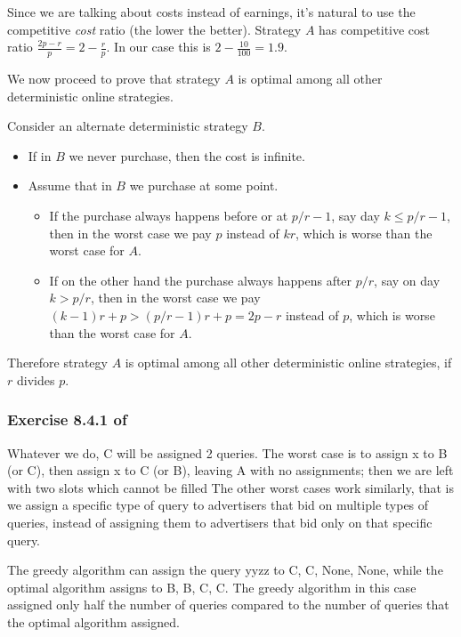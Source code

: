 \documentclass{article}
\begin{document}
Since we are talking about costs instead of earnings,
it's natural to use the competitive \emph{cost} ratio (the lower the better).
Strategy \(A\) has competitive cost ratio \(\frac{2p-r}{p} = 2 - \frac{r}{p}\).
In our case this is \(2 - \frac{10}{100} = 1.9\).

We now proceed to prove that strategy \(A\) is optimal
among all other deterministic online strategies.

Consider an alternate deterministic strategy \(B\).
\begin{itemize}
    \item If in \(B\) we never purchase,
        then the cost is infinite.
    \item Assume that in \(B\) we purchase at some point.
        \begin{itemize}
            \item If the purchase always happens before or at
                \(p/r - 1\), say day \(k \leq p/r - 1\),
                then in the worst case we pay
                \(p\) instead of \(kr\),
                which is worse than the worst case for \(A\).
            \item If on the other hand the purchase always happens after
                \(p/r\), say on day \(k > p/r\),
                then in the worst case we pay
                \((k-1)r + p > (p/r - 1)r + p = 2p - r \) instead of \(p\),
                which is worse than the worst case for \(A\).
        \end{itemize}
\end{itemize}

Therefore strategy \(A\) is optimal among all other
deterministic online strategies, if \(r\) divides \(p\).


\subsubsection*{Exercise 8.4.1 of \cite{mmds}}
 
Whatever we do, C will be assigned 2 queries.
The worst case is to assign x to B (or C), then assign x to C (or B),
leaving A with no assignments;
then we are left with two slots which cannot be filled
The other worst cases work similarly,
that is we assign a specific type of query
to advertisers that bid on multiple types of queries,
instead of assigning them to advertisers that bid only on that specific query.

The greedy algorithm can assign the query yyzz to C, C, None, None,
while the optimal algorithm assigns to B, B, C, C.
The greedy algorithm in this case assigned only half the number of queries
compared to the number of queries that the optimal algorithm assigned.
\end{document}
